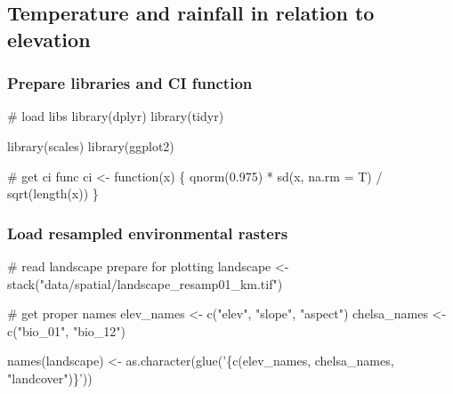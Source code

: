 \documentclass[]{article}
\newenvironment{Shaded}{}{}
\newcommand{\CommentTok}[1]{\textcolor[rgb]{0.00,0.50,0.00}{#1}}
\newcommand{\ControlFlowTok}[1]{\textcolor[rgb]{0.00,0.00,1.00}{#1}}
\newcommand{\DataTypeTok}[1]{#1}
\newcommand{\FloatTok}[1]{#1}
\newcommand{\KeywordTok}[1]{\textcolor[rgb]{0.00,0.00,1.00}{#1}}
\newcommand{\NormalTok}[1]{#1}
\newcommand{\OperatorTok}[1]{#1}
\newcommand{\StringTok}[1]{\textcolor[rgb]{0.00,0.50,0.50}{#1}}
\begin{document}
\hypertarget{temperature-and-rainfall-in-relation-to-elevation}{%
\subsection{Temperature and rainfall in relation to elevation}\label{temperature-and-rainfall-in-relation-to-elevation}}

\hypertarget{prepare-libraries-and-ci-function}{%
\subsubsection{Prepare libraries and CI function}\label{prepare-libraries-and-ci-function}}

\begin{Shaded}
\begin{Highlighting}[numbers=left,,]
\CommentTok{# load libs}
\KeywordTok{library}\NormalTok{(dplyr)}
\KeywordTok{library}\NormalTok{(tidyr)}

\KeywordTok{library}\NormalTok{(scales)}
\KeywordTok{library}\NormalTok{(ggplot2)}

\CommentTok{# get ci func}
\NormalTok{ci <-}\StringTok{ }\ControlFlowTok{function}\NormalTok{(x) \{}
  \KeywordTok{qnorm}\NormalTok{(}\FloatTok{0.975}\NormalTok{) }\OperatorTok{*}\StringTok{ }\KeywordTok{sd}\NormalTok{(x, }\DataTypeTok{na.rm =}\NormalTok{ T) }\OperatorTok{/}\StringTok{ }\KeywordTok{sqrt}\NormalTok{(}\KeywordTok{length}\NormalTok{(x))}
\NormalTok{\}}
\end{Highlighting}
\end{Shaded}

\hypertarget{load-resampled-environmental-rasters}{%
\subsubsection{Load resampled environmental rasters}\label{load-resampled-environmental-rasters}}

\begin{Shaded}
\begin{Highlighting}[numbers=left,,]
\CommentTok{# read landscape prepare for plotting}
\NormalTok{landscape <-}\StringTok{ }\KeywordTok{stack}\NormalTok{(}\StringTok{"data/spatial/landscape_resamp01_km.tif"}\NormalTok{)}

\CommentTok{# get proper names}
\NormalTok{elev_names <-}\StringTok{ }\KeywordTok{c}\NormalTok{(}\StringTok{"elev"}\NormalTok{, }\StringTok{"slope"}\NormalTok{, }\StringTok{"aspect"}\NormalTok{)}
\NormalTok{chelsa_names <-}\StringTok{ }\KeywordTok{c}\NormalTok{(}\StringTok{"bio_01"}\NormalTok{, }\StringTok{"bio_12"}\NormalTok{)}

\KeywordTok{names}\NormalTok{(landscape) <-}\StringTok{ }\KeywordTok{as.character}\NormalTok{(}\KeywordTok{glue}\NormalTok{(}\StringTok{'\{c(elev_names, chelsa_names, "landcover")\}'}\NormalTok{))}
\end{Highlighting}
\end{Shaded}
\end{document}
